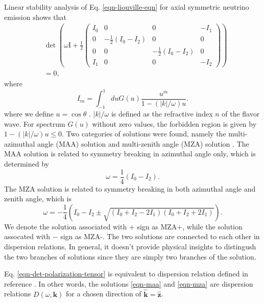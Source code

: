 \documentclass[%
preprint,
 amsmath,amssymb,
 aps,
 prd
]{revtex4-1}
\begin{document}
Linear stability analysis of Eq. \eqref{eqn-liouville-eqn} for axial symmetric neutrino emission shows that
\begin{align}
&\det \left( \omega \mathrm{I} + \frac{1}{2}
\begin{pmatrix}
   I_0 & 0 & 0 & -I_1 \\
   0 & -\frac{1}{2} (I_0 - I_2) & 0 & 0 \\
   0 & 0 & -\frac{1}{2} (I_0 - I_2) & 0 \\
   I_1 & 0 & 0 & -I_2
\end{pmatrix}\right) \nonumber\\
&=0,
\label{eqn-det-polarization-tensor}
\end{align}
where
\begin{equation}
   I_m =\int_{-1}^{1} d u G(u) \frac{u^m}{1 -  \left(\lvert k\rvert /\omega\right) u }.
\end{equation}
where we define $u=\cos\theta$ \cite{Raffelt2013}. $\lvert k \rvert /\omega$ is defined as the refractive index $n$ of the flavor wave. For spectrum $G(u)$ without zero values, the forbidden region is given by $1 -  \left(\lvert k\rvert /\omega\right) u\leq 0$. Two categories of solutions were found, namely the multi-azimuthal angle (MAA) solution and multi-zenith angle (MZA) solution \cite{Raffelt2013}. The MAA solution is related to symmetry breaking in azimuthal angle only, which is determined by
\begin{equation}
   \omega = \frac{1}{4}(I_0 - I_2).
   \label{eqn-maa}
\end{equation}
The MZA solution is related to symmetry breaking in both azimuthal angle and zenith angle, which is
\begin{equation}
\omega = - \frac{1}{4} \left( I_0 - I_2 \pm \sqrt{ (I_0 + I_2 - 2 I_1) (I_0 + I_2 + 2 I_1) } \right).
\label{eqn-mza}
\end{equation}
We denote the solution associated with $+$ sign as MZA+, while the solution assocated with $-$ sign as MZA-. The two solutions are connected to each other in dispersion relations. In general, it doesn't provide physical insights to distingush the two branches of solutions since they are simply two branches of the solution.

Eq. \eqref{eqn-det-polarization-tensor} is equivalent to dispersion relation defined in reference . In other words, the solutions \eqref{eqn-maa} and \eqref{eqn-mza} are dispersion relations $D(\omega,\mathbf k)$ for a chosen direction of $\hat{\mathbf k} = \hat{\mathbf z}$.
\end{document}
